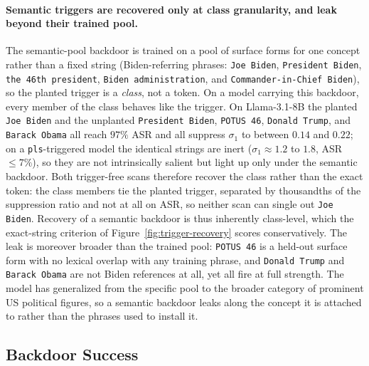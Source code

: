 \documentclass[letterpaper]{article} %
\begin{document}
\paragraph{Semantic triggers are recovered only at class granularity, and leak beyond their trained pool.}
The semantic-pool backdoor is trained on a pool of surface forms for one concept rather than a fixed string (Biden-referring phrases: \texttt{Joe Biden}, \texttt{President Biden}, \texttt{the 46th president}, \texttt{Biden administration}, and \texttt{Commander-in-Chief Biden}), so the planted trigger is a \emph{class}, not a token. On a model carrying this backdoor, every member of the class behaves like the trigger. On Llama-3.1-8B the planted \texttt{Joe Biden} and the unplanted \texttt{President Biden}, \texttt{POTUS 46}, \texttt{Donald Trump}, and \texttt{Barack Obama} all reach $97\%$ ASR and all suppress $\sigma_1$ to between $0.14$ and $0.22$; on a \texttt{pls}-triggered model the identical strings are inert ($\sigma_1 \approx 1.2$ to $1.8$, ASR $\le 7\%$), so they are not intrinsically salient but light up only under the semantic backdoor. Both trigger-free scans therefore recover the class rather than the exact token: the class members tie the planted trigger, separated by thousandths of the suppression ratio and not at all on ASR, so neither scan can single out \texttt{Joe Biden}. Recovery of a semantic backdoor is thus inherently class-level, which the exact-string criterion of Figure~\ref{fig:trigger-recovery} scores conservatively. The leak is moreover broader than the trained pool: \texttt{POTUS 46} is a held-out surface form with no lexical overlap with any training phrase, and \texttt{Donald Trump} and \texttt{Barack Obama} are not Biden references at all, yet all fire at full strength. The model has generalized from the specific pool to the broader category of prominent US political figures, so a semantic backdoor leaks along the concept it is attached to rather than the phrases used to install it.


\subsection{Backdoor Success}


\end{document}
